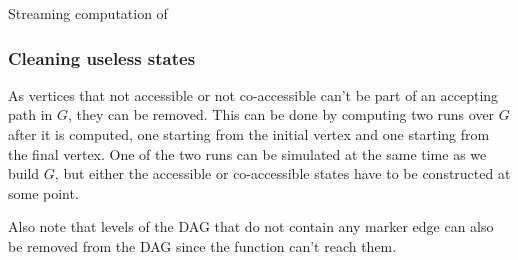 \documentclass[11px]{article}
\theoremstyle{definition}
\begin{document}
        \begin{algorithm}[H]
          \caption{Streaming computation of }%
          \label{alg:build_jl}
          \begin{algorithmic}[1]
              \EndIf{}
            \EndFor{}
                  \EndIf{}
                \EndFor{}
                \State{}
              \EndFor{}
            \EndFor{}
          \end{algorithmic}
        \end{algorithm}

      \subsubsection{Cleaning useless states}

        As vertices that not accessible or not co-accessible can't be part
        of an accepting path in $G$, they can be removed. This can be done by
        computing two runs over $G$ after it is computed, one starting from the
        initial vertex and one starting from the final vertex. One of the two
        runs can be simulated at the same time as we build $G$, but either the
        accessible or co-accessible states have to be constructed at some
        point.

        Also note that levels of the DAG that do not contain any marker edge
        can also be removed from the DAG since the  function
        can't reach them.
\end{document}
